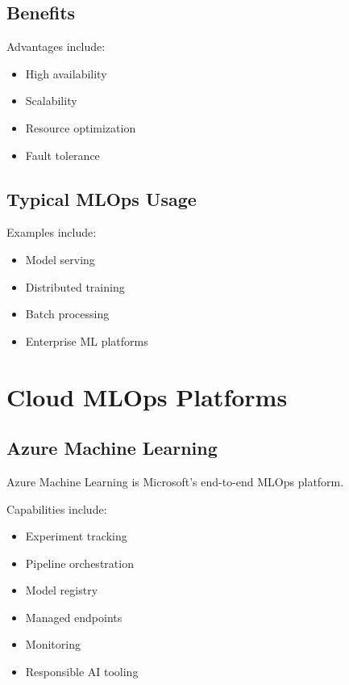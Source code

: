 \subsection{Benefits}

Advantages include:

\begin{itemize}
    \item High availability
    \item Scalability
    \item Resource optimization
    \item Fault tolerance
\end{itemize}

\subsection{Typical MLOps Usage}

Examples include:

\begin{itemize}
    \item Model serving
    \item Distributed training
    \item Batch processing
    \item Enterprise ML platforms
\end{itemize}

\section{Cloud MLOps Platforms}

\subsection{Azure Machine Learning}

Azure Machine Learning is Microsoft's end-to-end MLOps platform.

Capabilities include:

\begin{itemize}
    \item Experiment tracking
    \item Pipeline orchestration
    \item Model registry
    \item Managed endpoints
    \item Monitoring
    \item Responsible AI tooling
\end{itemize}

